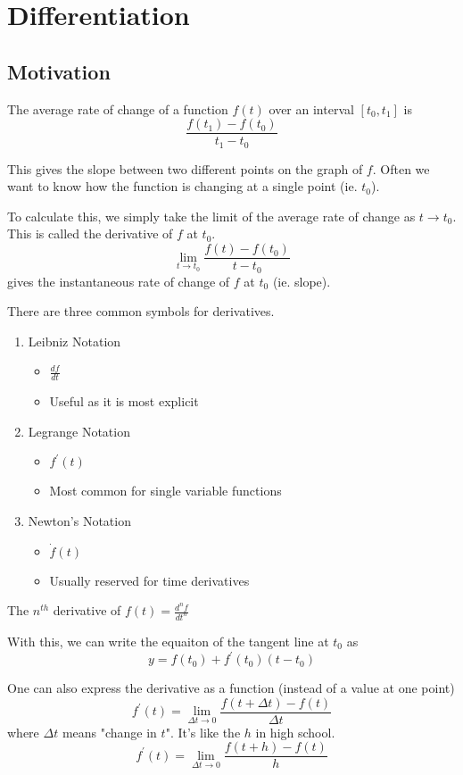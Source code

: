 \documentclass[12pt]{article}
\begin{document}
\section*{Differentiation}
\subsection*{Motivation}
The average rate of change of a function $f(t)$ over an interval $[t_0,t_1]$ is \[ \frac{f(t_1)-f(t_0)}{t_1-t_0} \]

This gives the slope between two different points on the graph of $f$. Often we want to know how the function is changing at a single point (ie. $t_0$).

To calculate this, we simply take the limit of the average rate of change as $t \to t_0$. This is called the derivative of $f$ at $t_0$. \[ \lim_{t\to t_0}\frac{f(t) - f(t_0)}{t-t_0} \] gives the instantaneous rate of change of $f$ at $t_0$ (ie. slope).

There are three common symbols for derivatives.
\begin{enumerate}
\item Leibniz Notation
\begin{itemize}
\item $\frac{df}{dt}$
\item Useful as it is most explicit
\end{itemize}
\item Legrange Notation
\begin{itemize}
\item $f^\prime(t)$
\item Most common for single variable functions
\end{itemize}
\item Newton's Notation
\begin{itemize}
\item $\dot{f}(t)$
\item Usually reserved for time derivatives
\end{itemize}
\end{enumerate}

The $n^{th}$ derivative of $f(t) = \frac{d^nf}{dt^n}$

With this, we can write the equaiton of the tangent line at $t_0$ as \[ y = f(t_0)+f^\prime(t_0)(t-t_0) \]

One can also express the derivative as a function (instead of a value at one point) \[ f^\prime(t) = \lim_{\Delta t\to 0}\frac{f(t+\Delta t)-f(t)}{\Delta t} \] where $\Delta t$ means "change in $t$". It's like the $h$ in high school. \[ f^\prime(t) = \lim_{\Delta t\to 0}\frac{f(t+h)-f(t)}{h} \]
\end{document}
